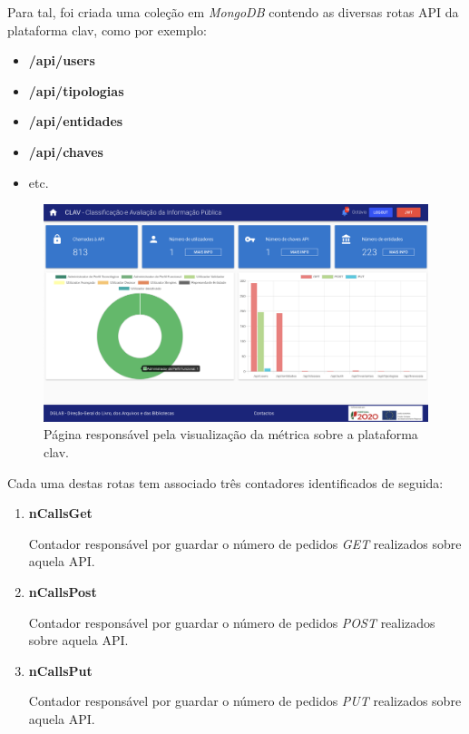 Para tal, foi criada uma coleção em \emph{MongoDB} contendo as diversas rotas API da plataforma \gls{clav}, como por exemplo:
\vspace{-1mm}
\begin{itemize}
    \item \textbf{/api/users}
    \item \textbf{/api/tipologias}
    \item \textbf{/api/entidades}
    \item \textbf{/api/chaves}
    \item etc.
\end{itemize}
\vspace{-2mm}
\begin{figure}[H]
    \centering
    \includegraphics[width=\textwidth]{img/clav/metrica/metrica.png}
    \caption{Página responsável pela visualização da métrica sobre a plataforma \gls{clav}.}
    \label{fig:metricaCLAV}
\end{figure}

Cada uma destas rotas tem associado três contadores identificados de seguida:
\vspace{-1mm}
\begin{enumerate}
    \item \textbf{nCallsGet}
    
    Contador responsável por guardar o número de pedidos \emph{GET} realizados sobre aquela API.
    
    \item \textbf{nCallsPost}
    
    Contador responsável por guardar o número de pedidos \emph{POST} realizados sobre aquela API.
    
    \item \textbf{nCallsPut}
    
    Contador responsável por guardar o número de pedidos \emph{PUT} realizados sobre aquela API.
\end{enumerate}


